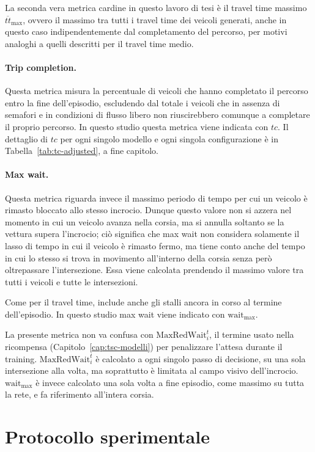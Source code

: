 La seconda vera metrica cardine in questo lavoro di tesi è il travel time massimo $\overline{tt}_{\max}$,
ovvero il massimo tra tutti i travel time dei veicoli generati, anche in questo caso indipendentemente
dal completamento del percorso, per motivi analoghi a quelli descritti per il travel time medio.

\paragraph{Trip completion.} Questa metrica misura la percentuale di veicoli che hanno completato il percorso entro la
fine dell'episodio, escludendo dal totale i veicoli che in assenza di semafori e in condizioni di flusso libero non riuscirebbero comunque
a completare il proprio percorso.
In questo studio questa metrica viene indicata con $tc$. Il dettaglio di
$tc$ per ogni singolo modello e ogni singola configurazione è in
Tabella~\ref{tab:tc-adjusted}, a fine capitolo.

\paragraph{Max wait.} Questa metrica riguarda invece il massimo periodo di tempo
per cui un veicolo è rimasto bloccato allo stesso incrocio.
Dunque questo valore non si azzera nel momento in cui un veicolo avanza nella corsia, ma si annulla
soltanto se la vettura supera l'incrocio; ciò significa che max wait non considera solamente
il lasso di tempo in cui il veicolo è rimasto fermo, ma tiene conto anche del tempo in cui lo stesso si trova in movimento all'interno della corsia senza però oltrepassare l'intersezione.
Essa viene calcolata prendendo il massimo valore tra tutti i veicoli e
tutte le intersezioni.

Come per il travel time, include anche gli stalli ancora in corso al
termine dell'episodio.
In questo studio max wait viene indicato con $\text{wait}_{\max}$.

La presente metrica non va confusa con $\mathrm{MaxRedWait}_i^t$, il termine
usato nella ricompensa (Capitolo~\ref{cap:tsc-modelli}) per
penalizzare l'attesa durante il training. $\mathrm{MaxRedWait}_i^t$ è
calcolato a ogni singolo passo di decisione, su una sola intersezione alla
volta, ma soprattutto è limitata al campo visivo dell'incrocio.
$\text{wait}_{\max}$ è invece calcolato una sola volta a fine
episodio, come massimo su tutta la rete, e fa riferimento all'intera corsia.

\section{Protocollo sperimentale}
\label{sec:protocollo}

